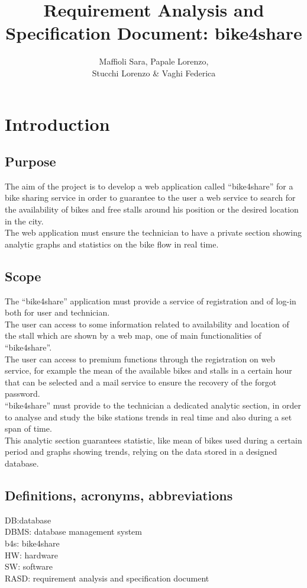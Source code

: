 \documentclass{article}
\title{Requirement Analysis and Specification Document: bike4share}
\author{Maffioli Sara, Papale Lorenzo, \\ Stucchi Lorenzo \& Vaghi Federica}
\begin{document}
\maketitle
\tableofcontents

\newpage

\section{Introduction}
\subsection{Purpose}
The aim of the project is to develop a web application called “bike4share” for a bike sharing service in order to guarantee to the user a web service to search for the availability of bikes and free stalls around his position or the desired location in the city.\\The web application must ensure the technician to have a private section showing analytic graphs and statistics on the bike flow in real time.
\subsection{Scope}
The “bike4share” application must provide a service of registration and of log-in both for user and technician.\\The user can access to some information related to availability and location of the stall which are shown by a web map, one of main functionalities of “bike4share”.\\The user can access to premium functions through the registration on web service, for example the mean of the available bikes and stalls in a certain hour that can be selected and a mail service to ensure the recovery of the forgot password.\\
“bike4share” must provide to the technician a dedicated analytic section, in order to analyse and study the bike stations trends in real time and also during a set span of time.\\This analytic section guarantees statistic, like mean of bikes used during a certain period and graphs showing trends, relying on the data stored in a designed database.
\subsection{Definitions, acronyms, abbreviations}
DB:database\\
DBMS: database management system\\
b4s: bike4share\\
HW: hardware\\
SW: software\\
RASD: requirement analysis and specification document
\end{document}
